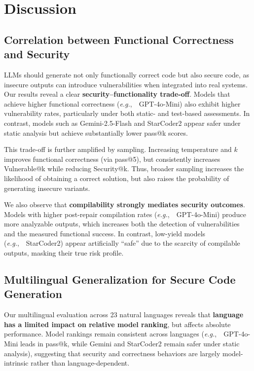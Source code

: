 \documentclass[pdflatex,sn-mathphys-ay]{sn-jnl}
\newcommand{\eg}{\textit{e.g.},\ }
\begin{document}
 
\section{Discussion}
\label{sec:discussion}

\subsection{Correlation between Functional Correctness and Security}
LLMs should generate not only functionally correct code but also secure code, as insecure outputs can introduce vulnerabilities when integrated into real systems. Our results reveal a clear \textbf{security--functionality trade-off}. Models that achieve higher functional correctness (\eg~GPT-4o-Mini) also exhibit higher vulnerability rates, particularly under both static- and test-based assessments. In contrast, models such as Gemini-2.5-Flash and StarCoder2 appear safer under static analysis but achieve substantially lower pass@k scores.

This trade-off is further amplified by sampling. Increasing temperature and $k$ improves functional correctness (via pass@5), but consistently increases Vulnerable@k while reducing Security@k. Thus, broader sampling increases the likelihood of obtaining a correct solution, but also raises the probability of generating insecure variants.

We also observe that \textbf{compilability strongly mediates security outcomes}. Models with higher post-repair compilation rates (\eg~GPT-4o-Mini) produce more analyzable outputs, which increases both the detection of vulnerabilities and the measured functional success. In contrast, low-yield models (\eg~StarCoder2) appear artificially ``safe'' due to the scarcity of compilable outputs, masking their true risk profile.

\subsection{Multilingual Generalization for Secure Code Generation}
Our multilingual evaluation across 23 natural languages reveals that \textbf{language has a limited impact on relative model ranking}, but affects absolute performance. Model rankings remain consistent across languages (\eg~GPT-4o-Mini leads in pass@k, while Gemini and StarCoder2 remain safer under static analysis), suggesting that security and correctness behaviors are largely model-intrinsic rather than language-dependent.
\end{document}
